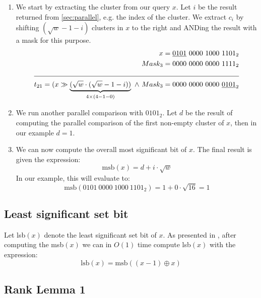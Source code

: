 \begin{enumerate}
    \item
    We start by extracting the cluster from our query $x$. Let $i$ be the result returned from \ref{sec:parallel}, e.g. the index of the cluster. We extract $c_i$ by shifting $(\sqrt{w} - 1 - i)$ clusters in $x$ to the right and ANDing the result with a mask for this purpose.
    \begin{align*}
        x = \underline{0101}\ 0000\ 1000\ 1101_2 &\\
        Mask_3 = 0000\ 0000\ 0000\ 1111_2 &\\
        \cline{1-2}
        t_{21} = (x \gg \underbrace{(\sqrt{w} \cdot (\sqrt{w} - 1 - i))}_{4\times(4-1-0)}\ \wedge\ Mask_3 = 0000\ 0000\ 0000\ \underline{0101}_2 &
    \end{align*}
    \item
    We run another parallel comparison with $0101_2$. Let $d$ be the result of computing the parallel comparison of the first non-empty cluster of $x$, then in our example $d = 1$.
    \item
    We can now compute the overall most significant bit of $x$. The final result is given the expression:
    \begin{equation*}
        \text{msb}(x) = d + i\cdot\sqrt{w}
    \end{equation*}
    In our example, this will evaluate to:
    \begin{equation*}
        \text{msb}(0101\ 0000\ 1000\ 1101_2) = 1 + 0\cdot\sqrt{16} = 1
    \end{equation*}
\end{enumerate}

\subsection{Least significant set bit}

Let lsb$(x)$ denote the least significant set bit of $x$. As presented in \cite{patrascu2014dynamic}, after computing the msb$(x)$ we can in $O(1)$ time compute lsb$(x)$ with the expression:
\begin{equation*}
    \text{lsb}(x) = \text{msb}((x - 1) \oplus x)
\end{equation*}

\subsection{Rank Lemma 1}

